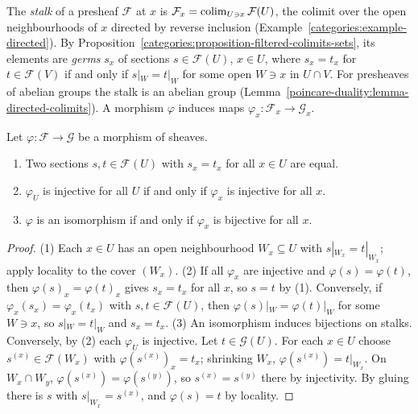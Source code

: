 \begin{definition}\label{sheaves:definition-stalk}
The \emph{stalk} of a presheaf $\mathcal{F}$ at $x$ is $\mathcal{F}_x = \operatorname*{colim}_{U \ni x}\mathcal{F}(U)$, the colimit over the open neighbourhoods of $x$ directed by reverse
inclusion (Example~\ref{categories:example-directed}). By Proposition~\ref{categories:proposition-filtered-colimits-sets}, its elements are \emph{germs} $s_x$ of sections
$s \in \mathcal{F}(U)$, $x \in U$, where $s_x = t_x$ for $t \in \mathcal{F}(V)$ if and only if $s|_W = t|_W$ for some open $W \ni x$ in $U \cap V$. For presheaves of abelian groups
the stalk is an abelian group (Lemma~\ref{poincare-duality:lemma-directed-colimits}). A morphism $\varphi$ induces maps $\varphi_x \colon \mathcal{F}_x \to \mathcal{G}_x$.
\end{definition}

\begin{proposition}\label{sheaves:proposition-stalks-detect}
Let $\varphi \colon \mathcal{F} \to \mathcal{G}$ be a morphism of sheaves.
\begin{enumerate}
\item Two sections $s, t \in \mathcal{F}(U)$ with $s_x = t_x$ for all $x \in U$ are equal.
\item $\varphi_U$ is injective for all $U$ if and only if $\varphi_x$ is injective for all $x$.
\item $\varphi$ is an isomorphism if and only if $\varphi_x$ is bijective for all $x$.
\end{enumerate}
\end{proposition}

\begin{proof}
(1) Each $x \in U$ has an open neighbourhood $W_x \subseteq U$ with $s|_{W_x} = t|_{W_x}$; apply locality to the cover $(W_x)$. (2) If all $\varphi_x$ are injective and
$\varphi(s) = \varphi(t)$, then $\varphi(s)_x = \varphi(t)_x$ gives $s_x = t_x$ for all $x$, so $s = t$ by (1). Conversely, if $\varphi_x(s_x) = \varphi_x(t_x)$ with $s, t \in \mathcal{F}(U)$,
then $\varphi(s)|_W = \varphi(t)|_W$ for some $W \ni x$, so $s|_W = t|_W$ and $s_x = t_x$. (3) An isomorphism induces bijections on stalks. Conversely, by (2) each $\varphi_U$ is
injective. Let $t \in \mathcal{G}(U)$. For each $x \in U$ choose $s^{(x)} \in \mathcal{F}(W_x)$ with $\varphi(s^{(x)})_x = t_x$; shrinking $W_x$, $\varphi(s^{(x)}) = t|_{W_x}$. On
$W_x \cap W_y$, $\varphi(s^{(x)}) = \varphi(s^{(y)})$, so $s^{(x)} = s^{(y)}$ there by injectivity. By gluing there is $s$ with $s|_{W_x} = s^{(x)}$, and $\varphi(s) = t$ by locality.
\end{proof}

